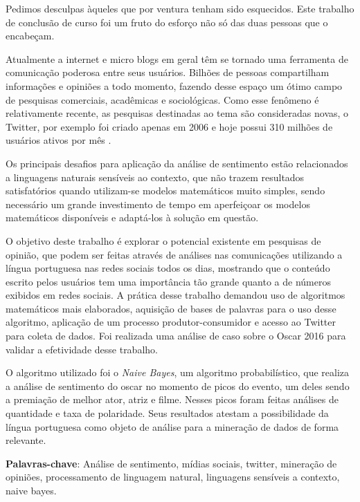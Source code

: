 Pedimos desculpas àqueles que por ventura tenham sido esquecidos. Este trabalho de conclusão de curso foi um fruto do esforço não só das duas pessoas que o encabeçam.
\begin{resumo}

Atualmente a internet e micro blogs em geral têm se tornado uma ferramenta de comunicação poderosa entre seus usuários. Bilhões de pessoas compartilham informações e opiniões a todo momento, fazendo desse espaço um ótimo campo de pesquisas comerciais, acadêmicas e sociológicas.  Como esse fenômeno é relativamente recente, as pesquisas destinadas ao tema são consideradas novas, o Twitter, por exemplo foi criado apenas em 2006 e hoje possui 310 milhões de usuários ativos por mês .


Os principais desafios para aplicação da análise de sentimento estão relacionados a linguagens naturais sensíveis ao contexto, que não trazem resultados satisfatórios quando utilizam-se modelos matemáticos muito simples, sendo necessário um grande investimento de tempo em aperfeiçoar os modelos matemáticos disponíveis e adaptá-los à solução em questão.


O objetivo deste trabalho é explorar o potencial existente em pesquisas de opinião,  que podem ser feitas através de análises nas comunicações utilizando a  língua portuguesa nas redes sociais todos os dias, mostrando que o conteúdo escrito pelos usuários tem uma importância tão grande quanto a de números exibidos em redes sociais. A prática desse trabalho demandou uso de algoritmos matemáticos mais elaborados, aquisição de bases de palavras para o uso desse algoritmo, aplicação de um processo produtor-consumidor e acesso ao Twitter para coleta de dados. Foi realizada uma análise de caso sobre o Oscar 2016 para validar a efetividade desse trabalho. 


O algoritmo utilizado foi o \textit{Naive Bayes}, um algoritmo probabilístico, que realiza a análise de sentimento do oscar no momento de picos do evento, um deles sendo a premiação de melhor ator, atriz e filme. Nesses picos foram feitas análises de quantidade  e  taxa de polaridade. Seus resultados atestam a possibilidade da língua portuguesa como objeto de análise para a mineração de dados de forma relevante.


{\hspace{-8mm} \bf{Palavras-chave}}: Análise de sentimento, mídias sociais, twitter, mineração de opiniões, processamento de linguagem natural, linguagens sensíveis a contexto, naive bayes.

\acresetall

\end{resumo}

